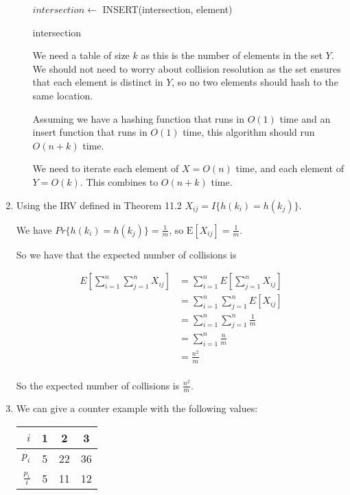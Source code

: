 \documentclass[12pt,letterpaper]{article}
\begin{document}
\begin{enumerate}
\begin{enumerate}
\begin{algorithmic}
                  \State $intersection \gets$ INSERT(intersection, element)
                \EndIf
              \EndFor

              \Return intersection

            \EndFunction
          \end{algorithmic}

          We need a table of size $k$ as this is the number of elements in the set $Y$.
          We should not need to worry about collision resolution as the set ensures that each element is distinct in $Y$,
          so no two elements should hash to the same location.

          Assuming we have a hashing function that runs in $O(1)$ time
          and an insert function that runs in $O(1)$ time,
          this algorithm should run $O(n+k)$ time.

          We need to iterate each element of $X = O(n)$ time,
          and each element of $Y = O(k)$.
          This combines to $O(n + k)$ time.
      \end{enumerate}

    \item
      Using the IRV defined in Theorem 11.2 $X_{ij} = I\{h(k_i) = h(k_j)\}$.

      We have $Pr\{h(k_i) = h(k_j)\} = \frac{1}{m}$,
      so $\text{E}[X_{ij}] = \frac{1}{m}$.

      So we have that the expected number of collisions is

      \begin{align*}
        E\left[\sum_{i=1}^n \sum_{j=1}^n X_{ij}\right] &= \sum_{i=1}^n E \left[\sum_{j=1}^n X_{ij} \right] \\
        &= \sum_{i=1}^n \sum_{j=1}^n E[X_{ij}] \\
        &= \sum_{i=1}^n \sum_{j=1}^n \frac{1}{m} \\
        &= \sum_{i=1}^n \frac{n}{m} \\
        &= \frac{n^2}{m} \\
      \end{align*}

      So the expected number of collisions is $\frac{n^2}{m}$.

    \item
      We can give a counter example with the following values:

      \begin{tabular}{r | c | c | c}
        $i$             & 1 & 2  & 3 \\
        \hline
        $p_i$           & 5 & 22 & 36 \\
        \hline
        $\frac{p_i}{i}$ & 5 & 11 & 12
      \end{tabular}


\end{enumerate}
\end{document}
